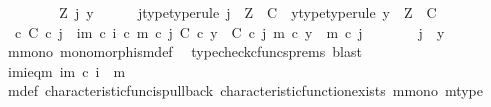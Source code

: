\begin{isabellebody}
\ \ \isamarkupfalse%
\isanewline
\ \ \ \ \isamarkupfalse%
\ Z\ j\ y\isanewline
\ \ \ \ \isamarkupfalse%
\ j{\isacharunderscore}{\kern0pt}type{\isacharbrackleft}{\kern0pt}type{\isacharunderscore}{\kern0pt}rule{\isacharbrackright}{\kern0pt}{\isacharcolon}{\kern0pt}\ {\isachardoublequoteopen}j\ {\isacharcolon}{\kern0pt}\ Z\ {\isasymrightarrow}\ C{\isachardoublequoteclose}\ \ y{\isacharunderscore}{\kern0pt}type{\isacharbrackleft}{\kern0pt}type{\isacharunderscore}{\kern0pt}rule{\isacharbrackright}{\kern0pt}{\isacharcolon}{\kern0pt}\ {\isachardoublequoteopen}y\ {\isacharcolon}{\kern0pt}\ Z\ {\isasymrightarrow}\ C{\isachardoublequoteclose}\isanewline
\ \ \ \ \isamarkupfalse%
\ {\isachardoublequoteopen}{\isasymt}\ {\isasymcirc}\isactrlsub c\ {\isasymbeta}\isactrlbsub C\isactrlesub \ {\isasymcirc}\isactrlsub c\ j\ {\isacharequal}{\kern0pt}\ {\isacharparenleft}{\kern0pt}{\isasymchi}im\ {\isasymcirc}\isactrlsub c\ i{\isacharparenright}{\kern0pt}\ {\isasymcirc}\isactrlsub c\ m\ {\isasymcirc}\isactrlsub c\ j{\isachardoublequoteclose}\ {\isachardoublequoteopen}{\isasymbeta}\isactrlbsub C\isactrlesub \ {\isasymcirc}\isactrlsub c\ y\ {\isacharequal}{\kern0pt}\ {\isasymbeta}\isactrlbsub C\isactrlesub \ {\isasymcirc}\isactrlsub c\ j{\isachardoublequoteclose}\ {\isachardoublequoteopen}m\ {\isasymcirc}\isactrlsub c\ y\ {\isacharequal}{\kern0pt}\ m\ {\isasymcirc}\isactrlsub c\ j{\isachardoublequoteclose}\isanewline
\ \ \ \ \isamarkupfalse%
\ \isamarkupfalse%
\ {\isachardoublequoteopen}j\ {\isacharequal}{\kern0pt}\ y{\isachardoublequoteclose}\isanewline
\ \ \ \ \ \ \isamarkupfalse%
\ m{\isacharunderscore}{\kern0pt}mono\ monomorphism{\isacharunderscore}{\kern0pt}def{}\ \isamarkupfalse%
\ {\isacharparenleft}{\kern0pt}typecheck{\isacharunderscore}{\kern0pt}cfuncs{\isacharunderscore}{\kern0pt}prems{\isacharcomma}{\kern0pt}\ blast{\isacharparenright}{\kern0pt}\isanewline
\ \ \isamarkupfalse%
\isanewline
\ \ \isamarkupfalse%
\ \isamarkupfalse%
\ {\isasymchi}im{\isacharunderscore}{\kern0pt}i{\isacharunderscore}{\kern0pt}eq{\isacharunderscore}{\kern0pt}{\isasymchi}m{\isacharcolon}{\kern0pt}\ {\isachardoublequoteopen}{\isasymchi}im\ {\isasymcirc}\isactrlsub c\ i\ {\isacharequal}{\kern0pt}\ {\isasymchi}m{\isachardoublequoteclose}\isanewline
\ \ \ \ \isamarkupfalse%
\ {\isasymchi}m{\isacharunderscore}{\kern0pt}def\ characteristic{\isacharunderscore}{\kern0pt}func{\isacharunderscore}{\kern0pt}is{\isacharunderscore}{\kern0pt}pullback\ characteristic{\isacharunderscore}{\kern0pt}function{\isacharunderscore}{\kern0pt}exists\ m{\isacharunderscore}{\kern0pt}mono\ m{\isacharunderscore}{\kern0pt}type\ \isamarkupfalse%

\end{isabellebody}
